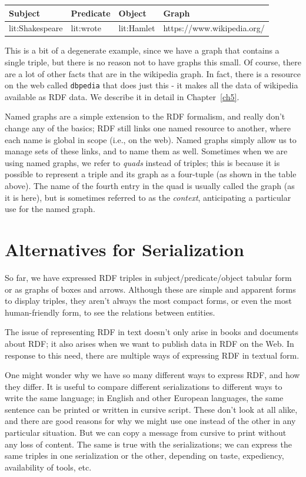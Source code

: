 \begin{tabular}{|llll|}
\hline
Subject&Predicate&Object&Graph\\
\hline
lit:Shakespeare&lit:wrote&lit:Hamlet&https://www.wikipedia.org/ \\
\hline
\end{tabular}


This is a bit of a degenerate example, since we have a graph that contains a single triple, 
but there is no reason not to have graphs this small.  Of course, there are a lot of other 
facts that are in the wikipedia graph.  In fact, there is a resource on the web called \texttt{dbpedia} that
does just this - it makes all the data of wikipedia available as RDF data.  We describe it in 
detail in Chapter~\ref{ch5}.


Named graphs are a simple extension to the RDF formalism, and really don't change any of the basics; 
RDF still links one named resource to another, where each name is global in scope (i.e., on the web). 
Named graphs simply allow us to manage sets of these links, and to name them as well.  Sometimes when
we are using named graphs, we refer to \emph{quads} instead of triples; this is because it is possible
to represent a triple and its graph as a four-tuple (as shown in the table above).  The name of the 
fourth entry in the quad is usually called the graph (as it is here), but is sometimes referred to as 
the \emph{context}, anticipating a particular use for the named graph. 

\section{Alternatives for Serialization}
\label{serialization}
So far, we have expressed RDF triples in subject/predicate/object
tabular form or as graphs of boxes and arrows. Although these are simple
and apparent forms to display triples, they aren't always the most
compact forms, or even the most human-friendly form, to see the
relations between entities.

The issue of representing RDF in text doesn't only arise in books and
documents about RDF; it also arises when we want to publish data in RDF
on the Web. In response to this need, there are multiple ways of
expressing RDF in textual form.

One might wonder why we have so many different ways to express RDF, and how they 
differ.  It is useful to compare different serializations to different ways to write
the same language; in English and other European languages, the same sentence can be printed
or written in cursive script.  These don't look at all alike, and there are good reasons
for why we might use one instead of the other in any particular situation.   But we can copy 
a message from cursive to print without any loss of content.  The same is true with the serializations; 
we can express the same triples in one serialization or the other, depending on taste, expediency, 
availability of tools, etc. 

